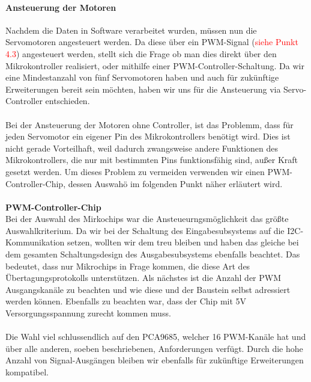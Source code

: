 \documentclass[titlepage,12pt,twoside]{article}
\begin{document}
\paragraph{Ansteuerung der Motoren}
\hfill \break
\hfill \break
Nachdem die Daten in Software verarbeitet wurden, müssen nun die Servomotoren angesteuert werden. Da diese über ein PWM-Signal (\textcolor{red}{siehe Punkt 4.3})
angesteuert werden, stellt sich die Frage ob man dies direkt über den Mikrokontroller realisiert, oder mithilfe einer PWM-Controller-Schaltung.
Da wir eine Mindestanzahl von fünf Servomotoren haben und auch für zukünftige Erweiterungen bereit sein möchten, haben wir uns für die Ansteuerung
via Servo-Controller entschieden. \\
\\
Bei der Ansteuerung der Motoren ohne Controller, ist das Problemm, dass für jeden Servomotor ein eigener Pin des Mikrokontrollers benötigt wird.
Dies ist nicht gerade Vorteilhaft, weil dadurch zwangsweise andere Funktionen des Mikrokontrollers, die nur mit bestimmten Pins funktionsfähig sind,
außer Kraft gesetzt werden. Um dieses Problem zu vermeiden verwenden wir einen PWM-Controller-Chip, dessen Auswahö im folgenden Punkt näher erläutert wird. \\
\\
\textbf{PWM-Controller-Chip}
\\
Bei der Auswahl des Mirkochips war die Ansteueurngsmöglichkeit das größte Auswahlkriterium. Da wir bei der Schaltung des Eingabesubsystems
auf die I2C-Kommunikation setzen, wollten wir dem treu bleiben und haben das gleiche bei dem gesamten Schaltungsdesign des Ausgabesubsystems
ebenfalls beachtet. Das bedeutet, dass nur Mikrochips in Frage kommen, die diese Art des Übertagungsprotokolls unterstützen. Als nächstes
ist die Anzahl der PWM Ausgangskanäle zu beachten und wie diese und der Baustein selbst adressiert werden können. Ebenfalls zu beachten war,
dass der Chip mit 5V Versorgungsspannung zurecht kommen muss. \\
\\
Die Wahl viel schlussendlich auf den PCA9685, welcher 16 PWM-Kanäle hat und über alle anderen, soeben beschriebenen, Anforderungen verfügt.
Durch die hohe Anzahl von Signal-Ausgängen bleiben wir ebenfalls für zukünftige Erweiterungen kompatibel. \\
\\
\end{document}
